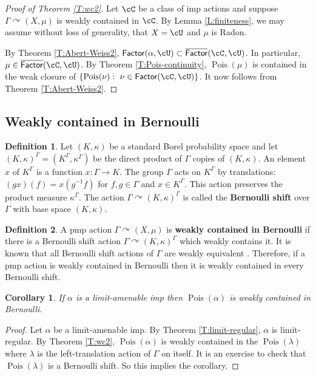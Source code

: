 \documentclass[12pt]{article}
\theoremstyle{plain}
\newtheorem{cor}[thm]{Corollary}
\theoremstyle{definition}
\newtheorem{defn}{Definition}
\theoremstyle{remark}
\newcommand{\G}{\Gamma}
\renewcommand\a{\alpha}
\renewcommand\k{\kappa}
\renewcommand\l{\lambda}
\newcommand\Pois{\operatorname{Pois}}
\def\cc{{\curvearrowright}}
\begin{document}
\begin{proof}[Proof of Theorem \ref{T:wc2}]
Let $\cC$ be a class of imp actions and suppose  $\G \cc (X,\mu)$ is weakly contained in $\cC$. By Lemma \ref{L:finiteness}, we may assume without loss of generality, that $X=\cU$ and $\mu$ is Radon.

By Theorem \ref{T:Abert-Weiss2}, $\mathsf{Factor}(\a,\cU) \subset \overline{\mathsf{Factor}}(\cC,\cU)$. In particular, $\mu \in \overline{\mathsf{Factor}}(\cC,\cU)$. By Theorem \ref{T:Pois-continuity}, $\Pois(\mu)$ is contained in the weak closure of $\{\Pois(\nu):~ \nu \in \mathsf{Factor}(\cC,\cU) \}$. It now follows from Theorem \ref{T:Abert-Weiss2}.

    
\end{proof}

\subsection{Weakly contained in Bernoulli}

\begin{defn}
    Let $(K,\k)$ be a standard Borel probability space and let $(K,\k)^\G=(K^\G,\k^\G)$ be the direct product of $\G$ copies of $(K,\k)$. An element $x$ of $K^\G$ is a function $x:\G \to K$. The group $\G$ acts on $K^\G$ by translations: $(gx)(f)=x(g^{-1}f)$ for $f,g \in \G$ and $x\in K^\G$. This action preserves the product measure $\k^\G$. The action $\G \cc (K,\k)^\G$ is called the {\bf Bernoulli shift} over $\G$ with base space $(K,\k)$.
\end{defn}

\begin{defn}
    A pmp action $\G \cc (X,\mu)$ is \textbf{weakly contained in Bernoulli} if there is a Bernoulli shift action $\G \cc (K,\k)^\G$ which weakly contains it. It is known that all Bernoulli shift actions of $\G$ are weakly equivalent \cite{abert-weiss-2013}. Therefore, if a pmp action is weakly contained in Bernoulli then it is weakly contained in every Bernoulli shift.
\end{defn}

\begin{cor}\label{weakbern}
    If $\a$ is a limit-amenable imp then $\Pois(\a)$ is weakly contained in Bernoulli.
\end{cor}

\begin{proof}
Let $\a$ be a limit-amenable imp. By Theorem \ref{T:limit-regular}, $\a$ is limit-regular. By Theorem \ref{T:wc2}, $\Pois(\a)$ is weakly contained in the $\Pois(\l)$ where $\l$ is the left-translation action of $\G$ on itself. It is an exercise to check that $\Pois(\l)$ is a Bernoulli shift. So this implies the corollary.
\end{proof}
\end{document}
